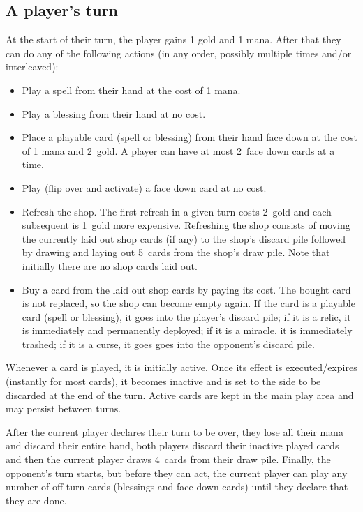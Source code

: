 \documentclass[dvipsnames,parskip,a4paper]{scrartcl}
\newcommand{\facedowncost}{2}
\newcommand{\refreshcost}{2}
\newcommand{\refreshcostincrease}{1}
\newcommand{\handsize}{4}
\newcommand{\facedownsize}{2}
\newcommand{\shopsize}{5}
\begin{document}
\subsection*{A player's turn}

At the start of their turn, the player gains 1 gold and 1 mana. After that they can do any of the following actions (in any order, possibly multiple times and/or interleaved):

\begin{itemize}
\item Play a spell from their hand at the cost of 1 mana.
\item Play a blessing from their hand at no cost.
\item Place a playable card (spell or blessing) from their hand face down at the cost of 1 mana and \facedowncost \ gold. A player can have at most \facedownsize \ face down cards at a time.
\item Play (flip over and activate) a face down card at no cost.
\item Refresh the shop. The first refresh in a given turn costs \refreshcost \ gold and each subsequent is \refreshcostincrease \ gold more expensive.
Refreshing the shop consists of moving the currently laid out shop cards (if any) to the shop's discard pile followed by drawing and laying out \shopsize \ cards from the shop's draw pile. Note that initially there are no shop cards laid out.
\item Buy a card from the laid out shop cards by paying its cost.
The bought card is not replaced, so the shop can become empty again. If the card is a playable card (spell or blessing), it goes into the player's discard pile; if it is a relic, it is immediately and permanently deployed; if it is a miracle, it is immediately trashed; if it is a curse, it goes goes into the opponent's discard pile.
\end{itemize}

Whenever a card is played, it is initially active. Once its effect is executed/expires (instantly for most cards), it becomes inactive and is set to the side to be discarded at the end of the turn. Active cards are kept in the main play area and may persist between turns.

\vspace{4pt}

After the current player declares their turn to be over, they lose all their mana and discard their entire hand, both players discard their inactive played cards and then the current player draws \handsize \ cards from their draw pile. Finally, the opponent's turn starts, but before they can act, the current player can play any number of off-turn cards (blessings and face down cards) until they declare that they are done.
\end{document}
